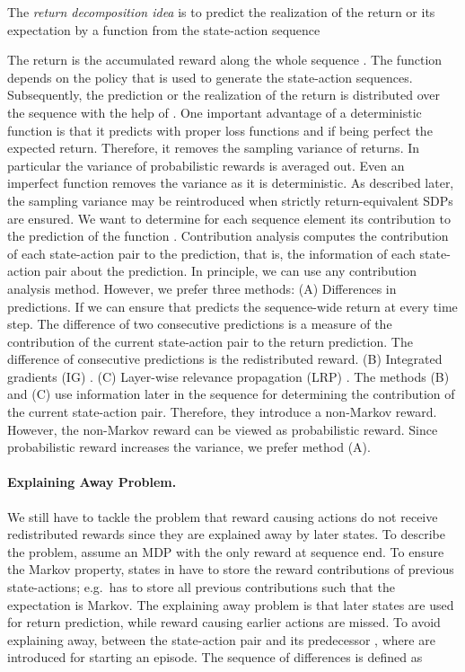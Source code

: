 \documentclass{article}
\begin{document}
\begin{appendices}
The {\em return decomposition idea} is 
to predict the realization of the return or its
expectation by a function  from the state-action sequence 

The return is the accumulated reward along the whole sequence
.
The function  depends on the policy  that is used to 
generate the state-action sequences.
Subsequently, the prediction or the realization of the return
is distributed over
the sequence with the help of .
One important advantage of a deterministic function  is 
that it predicts with proper loss functions and if being perfect 
the expected return. Therefore, it 
removes the sampling variance of returns. 
In particular the variance of probabilistic rewards is averaged out. 
Even an imperfect function  removes the variance as it is deterministic.
As described later, the sampling variance may be 
reintroduced when strictly return-equivalent SDPs are ensured.
We want to determine for each sequence element 
its contribution to the prediction of the function . 
Contribution analysis computes the contribution of each 
state-action pair to the prediction, that is, the information of each
state-action pair about the prediction. 
In principle, we can use any contribution analysis method.
However, we prefer three methods:
(A) Differences in predictions.
If we can ensure that  predicts the sequence-wide return
at every time step. 
The difference of two consecutive predictions is a measure of
the contribution of the current state-action pair to the return prediction.
The difference of consecutive predictions is the redistributed reward.
(B) Integrated gradients (IG) \cite{Sundararajan:17}.
(C) Layer-wise relevance propagation (LRP) \cite{Bach:15}.
The methods (B) and (C) use information later in the sequence for
determining the contribution of the current state-action pair. Therefore,
they introduce a non-Markov reward. 
However, the non-Markov reward can be viewed as probabilistic reward.
Since probabilistic reward increases the variance, we prefer method (A).

\paragraph{Explaining Away Problem.}
\label{para:AexplainingAway}
We still have to tackle the problem that reward causing actions do not receive redistributed rewards
since they are explained away by later states.
To describe the problem, assume an MDP  with the only 
reward at sequence end.
To ensure the Markov property, states in  have to store 
the reward contributions of previous state-actions;
e.g.\  has to store all previous contributions such that the expectation 
is Markov.
The explaining away problem is that later states
are used for return prediction, while reward causing
earlier actions are missed.
To avoid explaining away,
between the state-action pair  and its predecessor , where
 are introduced for starting an episode.
The sequence of differences is defined as


\end{appendices}
\end{document}
